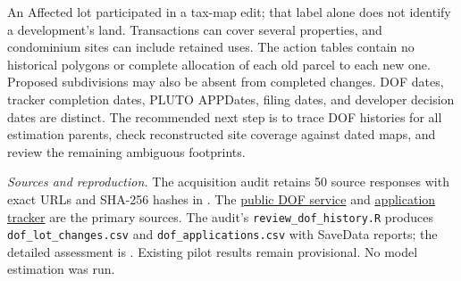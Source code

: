 An Affected lot participated in a tax-map edit; that label alone does not
identify a development's land. Transactions can cover several properties,
and condominium sites can include retained uses. The action tables contain
no historical polygons or complete allocation of each old parcel to each
new one. Proposed subdivisions may also be absent from completed changes.
DOF dates, tracker completion dates, PLUTO APPDates, filing dates, and
developer decision dates are distinct. The recommended next step is to trace
DOF histories for all estimation parents, check reconstructed site coverage
against dated maps, and review the remaining ambiguous footprints.

\small
\textit{Sources and reproduction.} The acquisition audit retains 50 source
responses with exact URLs and SHA-256 hashes in
.
The \href{https://services6.arcgis.com/yG5s3afENB5iO9fj/ArcGIS/rest/services/DTM_ETL_DAILY_view/FeatureServer}{public DOF service}
and \href{https://nycdof.maps.arcgis.com/apps/dashboards/4c90c216b3064767805833ff147a7e2a}{application tracker}
are the primary sources. The audit's \texttt{review\_dof\_history.R} produces
\texttt{dof\_lot\_changes.csv} and \texttt{dof\_applications.csv} with SaveData
reports; the detailed assessment is
.
Existing pilot results remain provisional. No model estimation was run.
\normalsize
